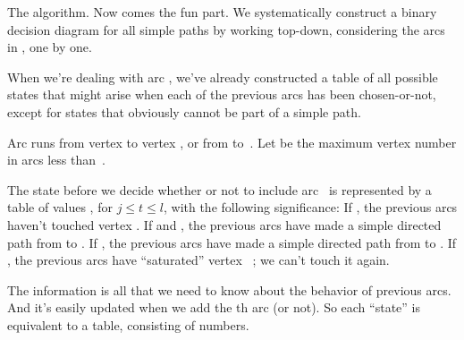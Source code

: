 The algorithm.
Now comes the fun part. We systematically construct a binary decision
diagram for all simple paths by working top-down, considering the
arcs in , one by one.

When we're dealing with arc , we've already constructed a table of
all possible states that might arise when each of the previous arcs has
been chosen-or-not, except for states that obviously cannot be
part of a simple path.

Arc  runs from vertex  to vertex ,
or from  to~.
Let  be the maximum vertex number in arcs less than~.

The state before we decide whether or not to include arc~ is
represented by a table of values , for $j\le t\le l$,
with the following significance:
If , the previous arcs haven't touched vertex .
If  and , the previous arcs have made a
simple directed
path from  to .
If , the previous arcs have made a simple directed
path from  to .
If , the previous arcs have ``saturated'' vertex~%
; we can't
touch it again.

The  information is all that we need to know about the behavior of
previous arcs. And it's easily updated when we add the th arc (or not).
So each ``state'' is equivalent to a  table, consisting of
 numbers.

